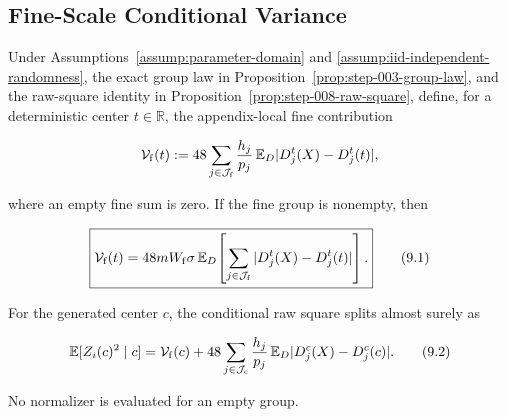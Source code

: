 \subsection{Fine-Scale Conditional Variance}\label{app:step-009}

\begin{lemma}\label{lem:step-009-fine-square-reduction}
Under Assumptions~\ref{assump:parameter-domain} and
\ref{assump:iid-independent-randomness}, the exact group law in
Proposition~\ref{prop:step-003-group-law}, and the raw-square
identity in Proposition~\ref{prop:step-008-raw-square}, define, for a
deterministic center \(t\in\mathbb R\), the appendix-local fine contribution

\[
\mathcal V_{\rm f}(t)
:=48\sum_{j\in\mathcal J_{\rm f}}
\frac{h_j}{p_j}\,
\mathbb E_D|D_j^t(X)-D_j^t(t)|,
\]

where an empty fine sum is zero. If the fine group is nonempty, then

\[
\boxed{
\mathcal V_{\rm f}(t)
=48mW_{\rm f}\sigma\,
\mathbb E_D\!\left[
\sum_{j\in\mathcal J_{\rm f}}
|D_j^t(X)-D_j^t(t)|
\right].
}
\tag{9.1}
\]

For the generated center \(c\), the conditional raw square splits
almost surely as

\[
\mathbb E[Z_i(c)^2\mid c]
=\mathcal V_{\rm f}(c)
+48\sum_{j\in\mathcal J_{\rm c}}
\frac{h_j}{p_j}\,
\mathbb E_D|D_j^c(X)-D_j^c(c)|.
\tag{9.2}
\]

No normalizer is evaluated for an empty group.
\end{lemma}

